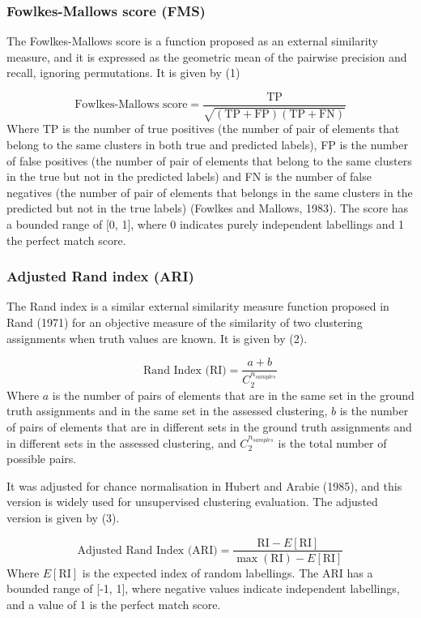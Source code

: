 \documentclass[nocrop]{bioinfo}
\begin{document}
\begin{methods}
\subsubsection{Fowlkes-Mallows score (FMS)}
The Fowlkes-Mallows score is a function proposed as an external similarity measure, and it is expressed as the geometric mean of the pairwise precision and recall, ignoring permutations. It is given by (1)

\begin{equation}
\text{Fowlkes-Mallows score} = \frac{\text{TP}}{\sqrt{(\text{TP} + \text{FP}) (\text{TP} + \text{FN})}}\label{eq:01}
\end{equation}
Where TP is the number of true positives (the number of pair of elements that belong to the same clusters in both true and predicted labels), FP is the number of false positives (the number of pair of elements that belong to the same clusters in the true but not in the predicted labels) and FN is the number of false negatives (the number of pair of elements that belongs in the same clusters in the predicted but not in the true labels) (Fowlkes and Mallows, 1983). The score has a bounded range of [0, 1], where 0 indicates purely independent labellings and 1 the perfect match score.

\subsubsection{Adjusted Rand index (ARI)}
The Rand index is a similar external similarity measure function proposed in Rand (1971) for an objective measure of the similarity of two clustering assignments when truth values are known. It is given by (2).

\begin{equation}
\text{Rand Index (RI)} = \frac{a + b}{C_2^{n_{samples}}}\label{eq:02}
\end{equation}
Where $a$ is the number of pairs of elements that are in the same set in the ground truth assignments and in the same set in the assessed clustering, $b$ is the number of pairs of elements that are in different sets in the ground truth assignments and in different sets in the assessed clustering, and \(C_2^{n_{samples}}\) is the total number of possible pairs.

It was adjusted for chance normalisation in Hubert and Arabie (1985), and this version is widely used for unsupervised clustering evaluation. The adjusted version is given by (3).

\begin{equation}
\text{Adjusted Rand Index (ARI)} = \frac{\text{RI} - E[\text{RI}]}{\max(\text{RI}) - E[\text{RI}]}\label{eq:03}
\end{equation}
Where $E[\text{RI}]$ is the expected index of random labellings. The ARI has a bounded range of [-1, 1], where negative values indicate independent labellings, and a value of 1 is the perfect match score.


\end{methods}
\end{document}
